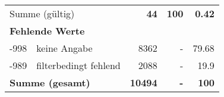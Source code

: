\begin{longtable}{lXrrr}
     \midrule
     \multicolumn{2}{l}{Summe (gültig)} &
       \textbf{\num{44}} &
     \textbf{100} &
       \textbf{\num[round-mode=places,round-precision=2]{0,42}} \\
     \multicolumn{5}{l}{\textbf{Fehlende Werte}}\\
       -998 &
       keine Angabe &
         \num{8362} &
        - &
         \num[round-mode=places,round-precision=2]{79,68} \\
       -989 &
       filterbedingt fehlend &
         \num{2088} &
        - &
         \num[round-mode=places,round-precision=2]{19,9} \\
     \midrule
     \multicolumn{2}{l}{\textbf{Summe (gesamt)}} &
          \textbf{\num{10494}} &
        \textbf{-} &
        \textbf{100} \\
     \bottomrule
     \end{longtable}
     
